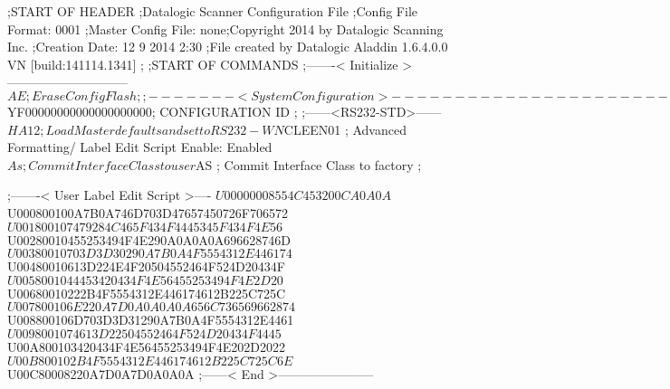 ;START OF HEADER
;Datalogic Scanner Configuration File
;Config File Format: 0001
;Master Config File: none;Copyright 2014 by Datalogic Scanning Inc.
;Creation Date: 12 9 2014 2:30
;File created by Datalogic Aladdin 1.6.4.0.0 VN [build:141114.1341]
;
;START OF COMMANDS
;-------< Initialize >-----------------------------
$AE                 ; Erase Config Flash
;
;-------< System Configuration >-------------------------------
$YF00000000000000000000; CONFIGURATION ID
;
;------<RS232-STD>------
$HA12               ; Load Master defaults and set to RS232-WN
$CLEEN01            ; Advanced Formatting/ Label Edit Script Enable: Enabled
$As                 ; Commit Interface Class to user
$AS                 ; Commit Interface Class to factory
;

;-------< User Label Edit Script >----
$U00000008554C453200CA0A0A
$U000800100A7B0A746D703D47657450726F706572
$U001800107479284C465F434F4445345F434F4E56
$U00280010455253494F4E290A0A0A0A696628746D
$U00380010703D3D30290A7B0A4F5554312E446174
$U00480010613D224E4F20504552464F524D20434F
$U0058001044453420434F4E56455253494F4E2D20
$U00680010222B4F5554312E446174612B225C725C
$U007800106E220A7D0A0A0A0A656C736569662874
$U008800106D703D3D31290A7B0A4F5554312E4461
$U0098001074613D22504552464F524D20434F4445
$U00A800103420434F4E56455253494F4E202D2022
$U00B800102B4F5554312E446174612B225C725C6E
$U00C80008220A7D0A7D0A0A0A
;------< End >-----------------------
